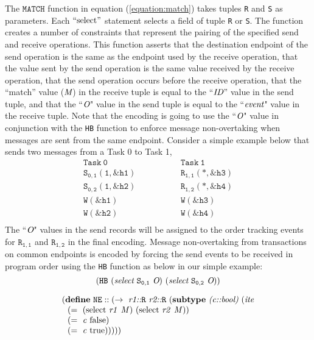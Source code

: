 The $\mathtt{MATCH}$ function in equation (\ref{equation:match}) takes tuples \texttt{R} and \texttt{S} as parameters. Each $``\mathrm{select}"$ statement selects a field of tuple \texttt{R} or \texttt{S}. The function creates a number of constraints that represent the pairing
of the specified send and receive operations. This function asserts that the
destination endpoint of the send operation is the same as the endpoint used by
the receive operation, that the value sent by the send operation is the same
value received by the receive operation, that the send operation occurs before
the receive operation, that the ``match'' value ($\emph{M}$) in the receive tuple is
equal to the ``$\emph{ID}$'' value in the send tuple, and that the ``$\emph{O}$" value in the send tuple is equal to the ``$\emph{event}$" value in the receive tuple. Note that the encoding is going to use the ``$\emph{O}$"  value in conjunction with the \texttt{HB} function to enforce message non-overtaking when messages are sent from the same endpoint. Consider a simple example below that sends two messages from a Task 0 to Task 1,
\[
\begin{array}{l|l}
\;\;\;\;\;\;\;\;\mathtt{Task\ 0}\;\;\;\;\;\;\;\; & \;\;\;\;\;\;\;\; \mathtt{Task\ 1}\;\;\;\;\;\;\;\; \\
\hline
\;\;\;\;\;\;\;\;\mathtt{S_{0,1}(1,\&h1)}\;\;\;\;\;\;\;\; & \;\;\;\;\;\;\;\; \mathtt{R_{1,1}(*,\&h3)}\;\;\;\;\;\;\;\; \\
\;\;\;\;\;\;\;\;\mathtt{S_{0,2}(1,\&h2)}\;\;\;\;\;\;\;\; & \;\;\;\;\;\;\;\; \mathtt{R_{1,2}(*,\&h4)}\;\;\;\;\;\;\;\; \\
\;\;\;\;\;\;\;\;\mathtt{W(\&h1)}\;\;\;\;\;\;\;\; & \;\;\;\;\;\;\;\; \mathtt{W(\&h3)}\;\;\;\;\;\;\;\; \\
\;\;\;\;\;\;\;\;\mathtt{W(\&h2)}\;\;\;\;\;\;\;\; & \;\;\;\;\;\;\;\; \mathtt{W(\&h4)}\;\;\;\;\;\;\;\; \\
\end{array}
\]
The ``$\emph{O}$" values in the send records will be assigned to the order tracking events for $\mathtt{R_{1,1}}$ and $\mathtt{R_{1,2}}$ in the final encoding. Message non-overtaking from transactions on common endpoints is encoded by forcing the send events to be received in program order using the \texttt{HB} function as below in our simple example:
\[(\mathtt{HB}\ (\cfgnt{select}\ \mathtt{S_{0,1}}\ \cfgnt{O})\ (\cfgnt{select}\ \mathtt{S_{0,2}}\ \cfgnt{O}))\]


\begin{equation}
\begin{array}{l}
(\cfgt{define}\ \mathtt{NE}::(\rightarrow\ \cfgnt{r1::}\texttt{R}\ \cfgnt{r2::}\texttt{R}\ (\cfgt{subtype}\ \cfgnt{(c::bool)}\ (\cfgnt{ite} \\
\ \ (=\ (\mathrm{select}\ \mathit{r1}\ \mathit{M})\ (\mathrm{select}\ \mathit{r2}\ \mathit{M})) \\
\ \ (=\ \mathit{c}\ \mathrm{false}) \\
\ \ (=\ \mathit{c}\ \mathrm{true})))))
\end{array}
\label{equation:ne}
\end{equation}

